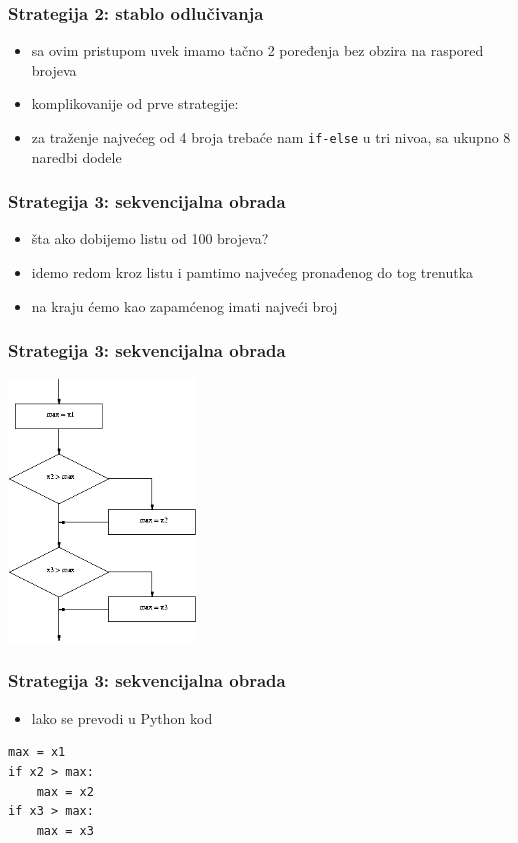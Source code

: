 \documentclass[utf8,compress]{beamer}
\begin{document}
\begin{frame}[fragile]
  \frametitle{Strategija 2: stablo odlučivanja}
  \begin{itemize}
    \item sa ovim pristupom uvek imamo tačno 2 poređenja bez obzira na raspored brojeva
    \item komplikovanije od prve strategije:
    \item za traženje najvećeg od 4 broja trebaće nam \texttt{if-else} u tri nivoa, sa ukupno 8 naredbi dodele
  \end{itemize}
\end{frame}

\begin{frame}[fragile]
  \frametitle{Strategija 3: sekvencijalna obrada}
  \begin{itemize}
    \item šta ako dobijemo listu od 100 brojeva?
    \item idemo redom kroz listu i pamtimo najvećeg pronađenog do tog trenutka
    \item na kraju ćemo kao zapamćenog imati najveći broj
  \end{itemize}
\end{frame}

\begin{frame}[fragile]
  \frametitle{Strategija 3: sekvencijalna obrada}
\begin{center}
  \includegraphics[width=5cm]{pic18}
\end{center}
\end{frame}

\begin{frame}[fragile]
  \frametitle{Strategija 3: sekvencijalna obrada}
  \begin{itemize}
    \item lako se prevodi u Python kod
  \end{itemize}
\begin{verbatim}
max = x1
if x2 > max:
    max = x2
if x3 > max:
    max = x3
\end{verbatim}
\end{frame}
\end{document}
